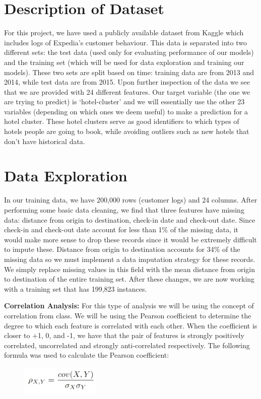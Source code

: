 \documentclass[conference]{IEEEtran}
\begin{document}
\section{\textbf{Description of Dataset}}
For this project, we have used a publicly available dataset from Kaggle which includes logs of Expedia's customer behaviour. This data is separated into two different sets: the test data (used only for evaluating performance of our models) and the training set (which will be used for data exploration and training our models). These two sets are split based on time: training data are from 2013 and 2014, while test data are from 2015. Upon further inspection of the data we see that we are provided with 24 different features. Our target variable (the one we are trying to predict) is ‘hotel-cluster’ and we will essentially use the other 23 variables (depending on which ones we deem useful) to make a prediction for a hotel cluster. These hotel clusters serve as good identifiers to which types of hotels people are going to book, while avoiding outliers such as new hotels that don't have historical data. 



\section{\textbf{Data Exploration}}

In our training data, we have 200,000 rows (customer logs) and 24 columns. After performing some basic data cleaning, we find that three features have missing data: distance from origin to destination, check-in date and check-out date. Since check-in and check-out date account for less than 1\% of the missing data, it would make more sense to drop these records since it would be extremely difficult to impute these. Distance from origin to destination accounts for 34\% of the missing data so we must implement a data imputation strategy for these records. We simply replace missing values in this field with the mean distance from origin to destination of the entire training set. After these changes, we are now working with a training set that has 199,823 instances.

\textbf{Correlation Analysis:} For this type of analysis we will be using the concept of correlation from class. We will be using the Pearson coefficient to determine the degree to which each feature is correlated with each other. When the coefficient is closer to +1, 0, and -1, we have that the pair of features is strongly positively correlated, uncorrelated and strongly anti-correlated respectively. The following formula was used to calculate the Pearson coefficient:
\begin{figure}[ht!] %
\centering
\includegraphics[width=1.5in]{pearson.PNG}
\label{pearson}
\end{figure}
\end{document}
